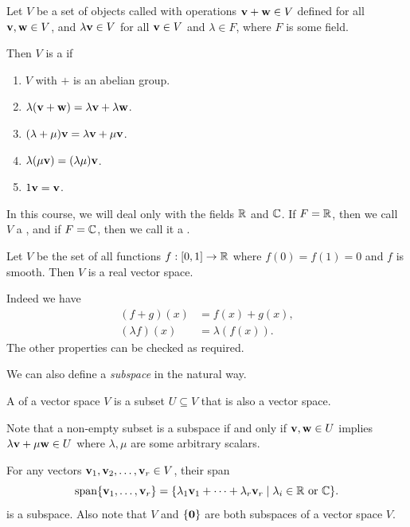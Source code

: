 \documentclass[a4paper]{scrartcl}
\begin{document}
\begin{definition}
  Let $V$ be a set of objects called  with operations $\mathbf{v} + \mathbf{w} \in V$ defined for all $\mathbf{v}, 
\mathbf{w} \in V$, and $\lambda \mathbf{v} \in V$ for all $\mathbf{v} \in V$ and $\lambda \in F$, where $F$ is some field. 

Then $V$ is a  if
\begin{enumerate}[label=(\roman*)]
    \item $V$ with $+$ is an abelian group.
    \item $\lambda( \mathbf{v} + \mathbf{w}) = \lambda \mathbf{v} + \lambda \mathbf{w}$.
    \item $(\lambda  + \mu)\mathbf{v} = \lambda \mathbf{v} + \mu \mathbf{v}$.
    \item $\lambda (\mu \mathbf{v}) = (\lambda \mu) \mathbf{v}$.
    \item $1 \mathbf{v} = \mathbf{v}$.
\end{enumerate}
\end{definition}

In this course, we will deal only with the fields $\mathbb{R}$ and $\mathbb{C}$. If $F = \mathbb{R}$, then we call $V$ a , and if $F = \mathbb{C}$, then we call it a .

\begin{example}
  Let $V$ be the set of all functions $f: [0, 1] \rightarrow \mathbb{R}$ where $f(0) = f(1) = 0$ and $f$ is smooth. Then $V$ is a real vector space.

  Indeed we have
  \begin{align*}
      (f + g)(x) &= f(x) + g(x), \\
      (\lambda f)(x) &= \lambda (f(x)).
  \end{align*}
  The other properties can be checked as required.
\end{example}

We can also define a \emph{subspace} in the natural way.

\begin{definition}[Subspace]
    A  of a vector space $V$ is a subset $U \subseteq V$ that is also a vector space.
\end{definition}

Note that a non-empty subset is a subspace if and only if $\mathbf{v}, \mathbf{w} \in U$ implies $\lambda \mathbf{v} + \mu \mathbf{w} \in U$ where $\lambda, \mu$ are some arbitrary scalars.

For any vectors $\mathbf{v}_1, \mathbf{v}_2, \dots, \mathbf{v}_r \in V$, their span
$$
    \operatorname{span} \{\mathbf{v}_1, \dots, \mathbf{v}_r\} = \{ \lambda_1 \mathbf{v}_1 + \cdots + \lambda_r \mathbf{v}_r \mid \lambda_i \in \mathbb{R} \text{ or } \mathbb{C} \}.
$$
is a subspace. Also note that $V$ and $\{ \mathbf{0} \}$ are both subspaces of a vector space $V$.
\end{document}
